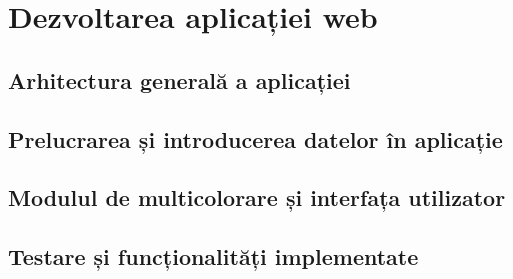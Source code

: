 \chapter{Dezvoltarea aplicației web}

\section{Arhitectura generală a aplicației}

\section{ Prelucrarea și introducerea datelor în aplicație}

\section{Modulul de multicolorare și interfața utilizator}

\section{Testare și funcționalități implementate}